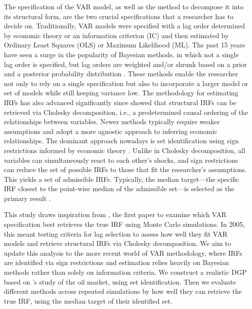\documentclass[12pt, a4paper]{article}
\begin{document}
The specification of the VAR model, as well as the method to decompose it into its structural form, are the two crucial specifications that a researcher has to decide on. Traditionally, VAR models were specified with a lag order determined by economic theory or an information criterion (IC) and then estimated by Ordinary Least Squares (OLS) or Maximum Likelihood (ML). The past 15 years have seen a surge in the popularity of Bayesian methods, in which not a single lag order is specified, but lag orders are weighted and/or shrunk based on a prior and a posterior probability distribution \citep{blakeAppliedBayesianEconometrics}. These methods enable the researcher not only to rely on a single specification but also to incorporate a larger model or set of models while still keeping variance low. The methodology for estimating IRFs has also advanced significantly since \citet{simsMacroeconomicsReality1980} showed that structural IRFs can be retrieved via Cholesky decomposition, i.e., a predetermined causal ordering of the relationships between variables. Newer methods typically require weaker assumptions and adopt a more agnostic approach to inferring economic relationships. The dominant approach nowadays is set identification using sign restrictions informed by economic theory \citep{uhligWhatAreEffects2005,rubio-ramirezStructuralVectorAutoregressions2010}. Unlike in Cholesky decomposition, all variables can simultaneously react to each other's shocks, and sign restrictions can reduce the set of possible IRFs to those that fit the researcher's assumptions. This yields a set of admissible IRFs. Typically, the median target—the specific IRF closest to the point-wise median of the admissible set—is selected as the primary result \citep{frySignRestrictionsStructural2011}.

This study draws inspiration from \citet{ivanovPractitionersGuideLag2005}, the first paper to examine which VAR specification best retrieves the true IRF using Monte Carlo simulations. In 2005, this meant testing criteria for lag selection to assess how well they fit VAR models and retrieve structural IRFs via Cholesky decomposition. We aim to update this analysis to the more recent world of VAR methodology, where IRFs are identified via sign restrictions and estimation relies heavily on Bayesian methods rather than solely on information criteria. We construct a realistic DGP based on \citet{kilianRoleInventoriesSpeculative2014}'s study of the oil market, using set identification. Then we evaluate different methods across repeated simulations by how well they can retrieve the true IRF, using the median target of their identified set. 
\end{document}
